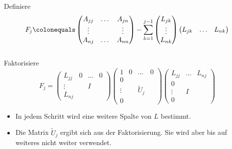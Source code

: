 \begin{algorithm}[H]
 \SetAlgoLined

 {
  Definiere
  \begin{equation*}
  F_j
  \colonequals
  \begin{pmatrix}
   A_{jj} & \dots & A_{jn} \\
   \vdots & & \vdots \\
   A_{nj} & \dots & A_{nn}
  \end{pmatrix}
  -
  \sum_{k=1}^{j-1}
  \begin{pmatrix}
   L_{jk} \\
   \vdots \\
   L_{nk}
  \end{pmatrix}
  \begin{pmatrix}
   L_{jk} & \ldots & L_{nk}
  \end{pmatrix}
  \end{equation*} \\

  Faktorisiere
 \begin{equation*}
  F_j
  =
  \begin{pmatrix}
   L_{jj} & 0 & \dots & 0 \\
   \vdots & & I & \\
   L_{nj} & & &
  \end{pmatrix}
  \begin{pmatrix}
   1 & 0 & \dots & 0 \\
   0 \\
   \vdots & & \widetilde{U}_j \\
   0
  \end{pmatrix}
  \begin{pmatrix}
   L_{jj} & \dots & L_{nj} \\
   0 \\
   \vdots & I & \\
   0 & &
  \end{pmatrix}
 \end{equation*}
 }
\end{algorithm}

\begin{itemize}
 \item In jedem Schritt wird eine weitere Spalte von $L$ bestimmt.
 \item Die Matrix $\widetilde{U}_j$ ergibt sich aus der Faktorisierung.
   Sie wird aber bis auf weiteres nicht weiter verwendet.
\end{itemize}




